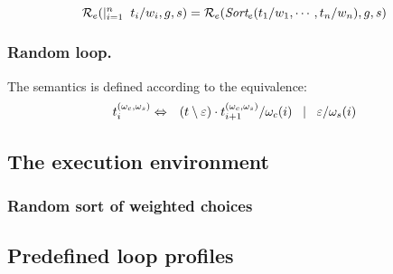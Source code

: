 \[
\mbox{${\cal R}_e$}(|_{i=1}^n\;\;t_i/w_i, g, s) = 
\mbox{${\cal R}_e$}(\mbox{$\mbox{\it Sort}_e$}(t_1/w_1, \cdots, t_n/w_n), g, s)
\]

\subsubsection{Random loop.}

The semantics is defined according to the equivalence:
\begin{eqnarray*}
\mbox{$t^{(\omega_c, \omega_s)}_{i}$}
& \Leftrightarrow &
(t\setminus\varepsilon)\cdot \mbox{$t^{(\omega_c, \omega_s)}_{i+1}$} / \omega_c(i)
\;\;\;|\;\;\;
\varepsilon / \omega_s(i)
\end{eqnarray*}

\subsection{The execution environment}

\subsubsection{Random sort of weighted choices}
\label{random-sort}

\subsection{Predefined loop profiles}
\label{loop-profiles}
